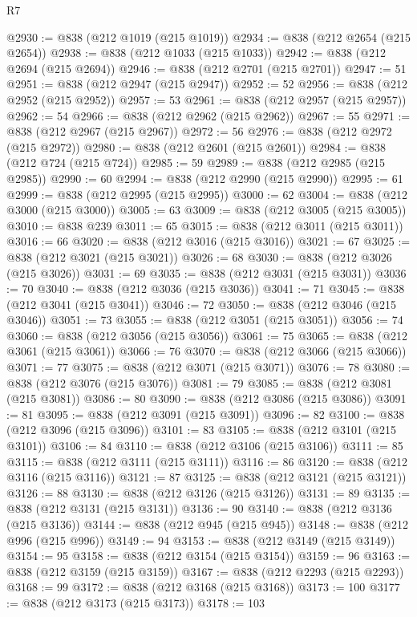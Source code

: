\begin{lexlean}{R7}
\begin{coremodule}
@2930 := @838 (@212 @1019 (@215 @1019))
@2934 := @838 (@212 @2654 (@215 @2654))
@2938 := @838 (@212 @1033 (@215 @1033))
@2942 := @838 (@212 @2694 (@215 @2694))
@2946 := @838 (@212 @2701 (@215 @2701))
@2947 := 51
@2951 := @838 (@212 @2947 (@215 @2947))
@2952 := 52
@2956 := @838 (@212 @2952 (@215 @2952))
@2957 := 53
@2961 := @838 (@212 @2957 (@215 @2957))
@2962 := 54
@2966 := @838 (@212 @2962 (@215 @2962))
@2967 := 55
@2971 := @838 (@212 @2967 (@215 @2967))
@2972 := 56
@2976 := @838 (@212 @2972 (@215 @2972))
@2980 := @838 (@212 @2601 (@215 @2601))
@2984 := @838 (@212 @724 (@215 @724))
@2985 := 59
@2989 := @838 (@212 @2985 (@215 @2985))
@2990 := 60
@2994 := @838 (@212 @2990 (@215 @2990))
@2995 := 61
@2999 := @838 (@212 @2995 (@215 @2995))
@3000 := 62
@3004 := @838 (@212 @3000 (@215 @3000))
@3005 := 63
@3009 := @838 (@212 @3005 (@215 @3005))
@3010 := @838 @239
@3011 := 65
@3015 := @838 (@212 @3011 (@215 @3011))
@3016 := 66
@3020 := @838 (@212 @3016 (@215 @3016))
@3021 := 67
@3025 := @838 (@212 @3021 (@215 @3021))
@3026 := 68
@3030 := @838 (@212 @3026 (@215 @3026))
@3031 := 69
@3035 := @838 (@212 @3031 (@215 @3031))
@3036 := 70
@3040 := @838 (@212 @3036 (@215 @3036))
@3041 := 71
@3045 := @838 (@212 @3041 (@215 @3041))
@3046 := 72
@3050 := @838 (@212 @3046 (@215 @3046))
@3051 := 73
@3055 := @838 (@212 @3051 (@215 @3051))
@3056 := 74
@3060 := @838 (@212 @3056 (@215 @3056))
@3061 := 75
@3065 := @838 (@212 @3061 (@215 @3061))
@3066 := 76
@3070 := @838 (@212 @3066 (@215 @3066))
@3071 := 77
@3075 := @838 (@212 @3071 (@215 @3071))
@3076 := 78
@3080 := @838 (@212 @3076 (@215 @3076))
@3081 := 79
@3085 := @838 (@212 @3081 (@215 @3081))
@3086 := 80
@3090 := @838 (@212 @3086 (@215 @3086))
@3091 := 81
@3095 := @838 (@212 @3091 (@215 @3091))
@3096 := 82
@3100 := @838 (@212 @3096 (@215 @3096))
@3101 := 83
@3105 := @838 (@212 @3101 (@215 @3101))
@3106 := 84
@3110 := @838 (@212 @3106 (@215 @3106))
@3111 := 85
@3115 := @838 (@212 @3111 (@215 @3111))
@3116 := 86
@3120 := @838 (@212 @3116 (@215 @3116))
@3121 := 87
@3125 := @838 (@212 @3121 (@215 @3121))
@3126 := 88
@3130 := @838 (@212 @3126 (@215 @3126))
@3131 := 89
@3135 := @838 (@212 @3131 (@215 @3131))
@3136 := 90
@3140 := @838 (@212 @3136 (@215 @3136))
@3144 := @838 (@212 @945 (@215 @945))
@3148 := @838 (@212 @996 (@215 @996))
@3149 := 94
@3153 := @838 (@212 @3149 (@215 @3149))
@3154 := 95
@3158 := @838 (@212 @3154 (@215 @3154))
@3159 := 96
@3163 := @838 (@212 @3159 (@215 @3159))
@3167 := @838 (@212 @2293 (@215 @2293))
@3168 := 99
@3172 := @838 (@212 @3168 (@215 @3168))
@3173 := 100
@3177 := @838 (@212 @3173 (@215 @3173))
@3178 := 103

\end{coremodule}
\end{lexlean}
